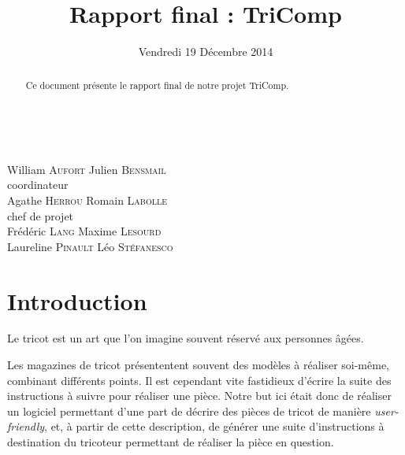 \documentclass{article}
\title{Rapport final : TriComp}
\author{}
\date{Vendredi 19 Décembre 2014}
\begin{document}
\makeatletter %
  \begin{titlepage}
    \begin{center}
       {\LARGE \@title} \\
       \vspace{2cm}
       {\large \@date}
       \vspace{3cm}
    \end{center}
       {\large
       {William \textsc{Aufort} \hfill Julien \textsc{Bensmail} \\}
    \vspace{1cm}
       {\hfill coordinateur \\}
       {Agathe \textsc{Herrou}  \hfill Romain \textsc{Labolle} \\}
       \vspace{1cm}
       {chef de projet \\}
       \vspace{1.5cm}
       {Frédéric \textsc{Lang} \hfill Maxime \textsc{Lesourd} \\}
       {Laureline \textsc{Pinault} \hfill Léo \textsc{Stéfanesco} \\}}
       \vspace{2.5cm}
    \begin{abstract}
	Ce document présente le rapport final de notre projet TriComp. 
    \end{abstract}
  \end{titlepage}
\makeatother

\newpage

\tableofcontents

\newpage

\section*{Introduction}

Le tricot est un art que l'on imagine souvent réservé aux personnes âgées.

Les magazines de tricot présententent souvent des modèles à réaliser soi-même, combinant différents points. Il est cependant vite fastidieux d'écrire la suite des 
instructions à suivre pour réaliser une pièce. Notre but ici était donc de réaliser un logiciel permettant d'une part de décrire des pièces de tricot de manière \emph{user-friendly}, et, à partir de cette description, de générer une suite d'instructions à destination du tricoteur permettant de réaliser la pièce en question. 
\end{document}
